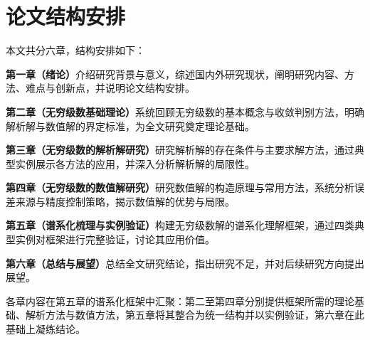 \section{论文结构安排}

本文共分六章，结构安排如下：

\textbf{第一章（绪论）}介绍研究背景与意义，综述国内外研究现状，阐明研究内容、方法、难点与创新点，并说明论文结构安排。

\textbf{第二章（无穷级数基础理论）}系统回顾无穷级数的基本概念与收敛判别方法，明确解析解与数值解的界定标准，为全文研究奠定理论基础。

\textbf{第三章（无穷级数的解析解研究）}研究解析解的存在条件与主要求解方法，通过典型实例展示各方法的应用，并深入分析解析解的局限性。

\textbf{第四章（无穷级数的数值解研究）}研究数值解的构造原理与常用方法，系统分析误差来源与精度控制策略，揭示数值解的优势与局限。

\textbf{第五章（谱系化梳理与实例验证）}构建无穷级数解的谱系化理解框架，通过四类典型实例对框架进行完整验证，讨论其应用价值。

\textbf{第六章（总结与展望）}总结全文研究结论，指出研究不足，并对后续研究方向提出展望。

各章内容在第五章的谱系化框架中汇聚：第二至第四章分别提供框架所需的理论基础、解析方法与数值方法，第五章将其整合为统一结构并以实例验证，第六章在此基础上凝练结论。
